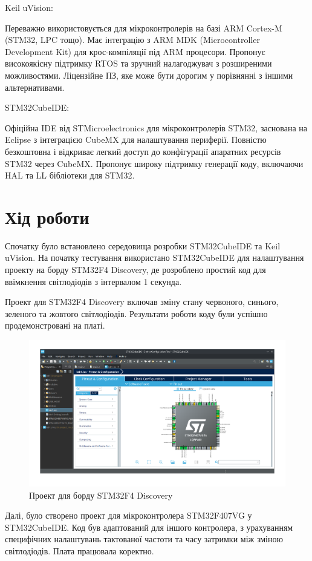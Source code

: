 \documentclass[oneside,14pt]{extarticle}
\begin{document}
\begin{normalsize}
Keil uVision:

Переважно використовується для мікроконтролерів на базі ARM Cortex-M (STM32, LPC тощо).
Має інтеграцію з ARM MDK (Microcontroller Development Kit) для крос-компіляції під ARM процесори.
Пропонує високоякісну підтримку RTOS та зручний налагоджувач з розширеними можливостями.
Ліцензійне ПЗ, яке може бути дорогим у порівнянні з іншими альтернативами.

STM32CubeIDE:

Офіційна IDE від STMicroelectronics для мікроконтролерів STM32, заснована на Eclipse з інтеграцією CubeMX для налаштування периферії.
Повністю безкоштовна і відкриває легкий доступ до конфігурації апаратних ресурсів STM32 через CubeMX.
Пропонує широку підтримку генерації коду, включаючи HAL та LL бібліотеки для STM32.

	\section*{\hfil Хід роботи\hfil}
	
	Спочатку було встановлено середовища розробки STM32CubeIDE та Keil uVision. На початку тестування використано STM32CubeIDE для налаштування проекту на борду STM32F4 Discovery, де розроблено простий код для ввімкнення світлодіодів з інтервалом 1 секунда.
	
	Проект для STM32F4 Discovery включав зміну стану червоного, синього, зеленого та жовтого світлодіодів. Результати роботи коду були успішно продемонстровані на платі.
	
	\begin{figure}[H]
		\centering
		\includegraphics[scale=0.4]{1}
		\caption{Проект для борду STM32F4 Discovery}
	\end{figure}
	
	Далі, було створено проект для мікроконтролера STM32F407VG у STM32CubeIDE. Код був адаптований для іншого контролера, з урахуванням специфічних налаштувань тактованої частоти та часу затримки між зміною світлодіодів. Плата працювала коректно.
	

\end{normalsize}
\end{document}
